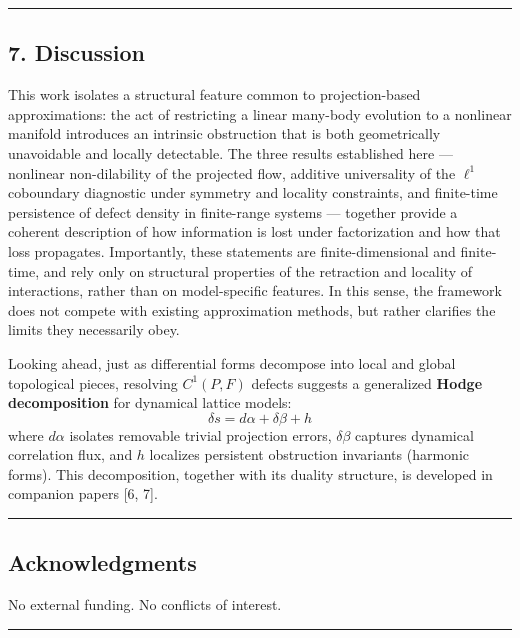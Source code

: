 \documentclass[
]{article}
\begin{document}
\begin{center}\rule{0.5\linewidth}{0.5pt}\end{center}

\subsection{7. Discussion}\label{discussion}

This work isolates a structural feature common to projection-based
approximations: the act of restricting a linear many-body evolution to a
nonlinear manifold introduces an intrinsic obstruction that is both
geometrically unavoidable and locally detectable. The three results
established here --- nonlinear non-dilability of the projected flow,
additive universality of the \(\ell^1\) coboundary diagnostic under
symmetry and locality constraints, and finite-time persistence of defect
density in finite-range systems --- together provide a coherent
description of how information is lost under factorization and how that
loss propagates. Importantly, these statements are finite-dimensional
and finite-time, and rely only on structural properties of the
retraction and locality of interactions, rather than on model-specific
features. In this sense, the framework does not compete with existing
approximation methods, but rather clarifies the limits they necessarily
obey.

Looking ahead, just as differential forms decompose into local and
global topological pieces, resolving \(C^1(P, F)\) defects suggests a
generalized \textbf{Hodge decomposition} for dynamical lattice models:
\[ \delta s = d\alpha + \delta\beta + h \] where \(d\alpha\) isolates
removable trivial projection errors, \(\delta\beta\) captures dynamical
correlation flux, and \(h\) localizes persistent obstruction invariants
(harmonic forms). This decomposition, together with its duality
structure, is developed in companion papers {[}6, 7{]}.

\begin{center}\rule{0.5\linewidth}{0.5pt}\end{center}

\subsection{Acknowledgments}\label{acknowledgments}

No external funding. No conflicts of interest.

\begin{center}\rule{0.5\linewidth}{0.5pt}\end{center}
\end{document}
